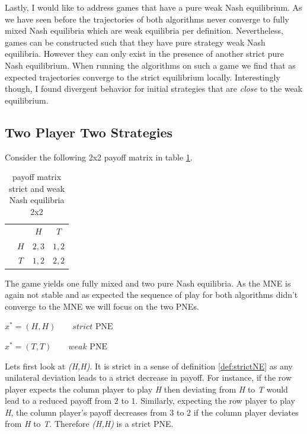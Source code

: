 Lastly, I would like to address games that have a pure weak Nash equilibrium. As we have seen before the trajectories of both algorithms never converge to fully mixed Nash equilibria which are weak equilibria per definition. Nevertheless, games can be constructed such that they have pure strategy weak Nash equilibria. However they can only exist in the presence of another strict pure Nash equilibrium. When running the algorithms on such a game we find that as expected trajectories converge to the strict equilibrium locally. Interestingly though, I found divergent behavior for initial strategies that are \textit{close} to the weak equilibrium. 

\subsection{Two Player Two Strategies}\label{subsection:TwoPlayerTwoStrategies}

Consider the following 2x2 payoff matrix in table \ref{tab:payoffStrictAndWeak2x2}.

\begin{table}[H]\centering
\setlength{\extrarowheight}{2pt}
\begin{tabular}{cc|c|c|}
  & \multicolumn{1}{c}{} & \multicolumn{1}{c}{$H$}  & \multicolumn{1}{c}{$T$} \\\cline{3-4}
  & $H$ & $2,3$ & $1,2$ \\\cline{3-4}
  & $T$ & $1,2$ & $2,2$ \\\cline{3-4}
\end{tabular}\caption{\label{tab:payoffStrictAndWeak2x2}payoff matrix strict and weak Nash equilibria 2x2}
\end{table}

The game yields one fully mixed and two pure Nash equilibria. As the MNE is again not stable and as expected the sequence of play for both algorithms didn't converge to the MNE we will focus on the two PNEs. 

\begin{description}\centering
    \item $x^{*} = (H,H) \qquad \textit{strict }\text{PNE}$
    \item $x^{*} = (T,T) \qquad \textit{weak }\text{PNE}$
\end{description}

Lets first look at \textit{(H,H)}. It is strict in a sense of definition \ref{def:strictNE} as any unilateral deviation leads to a strict decrease in payoff. For instance, if the row player expects the column player to play \textit{H} then deviating from \textit{H} to \textit{T} would lead to a reduced payoff from $2$ to $1$. Similarly, expecting the row player to play \textit{H}, the column player's payoff decreases from $3$ to $2$ if the column player deviates from \textit{H} to \textit{T}. Therefore \textit{(H,H)} is a strict PNE. \\

